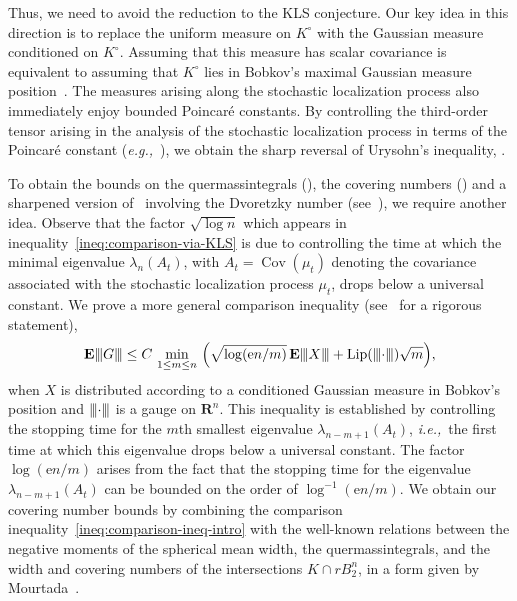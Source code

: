 \documentclass[11pt]{amsart}
\newcommand{\R}{\mathbf R}
\newcommand{\E}{\mathbf E}
\newcommand{\Cov}{\operatorname{Cov}}
\newcommand{\Lip}{\operatorname{Lip}}
\newcommand{\1}{\mathbf 1}
\newcommand{\vertiii}[1]{{\left\vert\kern-0.25ex\left\vert\kern-0.25ex\left\vert #1 
\right\vert\kern-0.25ex\right\vert\kern-0.25ex\right\vert}}
\newcommand{\gauge}[1]{\vertiii{#1}}
\newcommand{\e}{\mathrm{e}}
\newcommand{\ie}{\emph{i.e.,}}
\newcommand{\eg}{\emph{e.g.,}}
\theoremstyle{plain}
\begin{document}
Thus, we need to avoid the reduction to the KLS conjecture. Our key idea in this direction is to replace the uniform measure on $K^\circ$ with the Gaussian measure conditioned on $K^\circ$. Assuming that this measure has scalar covariance is equivalent to assuming that $K^\circ$ lies in Bobkov's maximal Gaussian measure position~\cite{Bob11}. The measures arising along the stochastic localization process also immediately enjoy bounded Poincar\'{e} constants. By controlling the third-order tensor arising in the analysis of the stochastic localization process in terms of the Poincar\'e constant (\eg~), we obtain the sharp reversal of Urysohn's inequality, .

To obtain the bounds on the quermassintegrals (), the covering numbers () and a sharpened version of~ involving the Dvoretzky number (see~), we require another idea. Observe that the factor $\sqrt{\log n}$ which appears in inequality~\eqref{ineq:comparison-via-KLS} is due to controlling the time at which the minimal eigenvalue $\lambda_n(A_t)$, with $A_t = \Cov(\mu_t)$ denoting the covariance associated with the stochastic localization process $\mu_t$, drops below a universal constant. We prove a more general comparison inequality (see~ for a rigorous statement),
\begin{equation}
    \label{ineq:comparison-ineq-intro}
\E \gauge{G} \leq C \,\min_{1 \leq m \leq n } \, \Big(\sqrt{\log(\e n/m)} \, \E \gauge{X} + \Lip(\gauge{\cdot})\sqrt{m} \Big),
\end{equation}
when $X$ is distributed according to a conditioned Gaussian measure in Bobkov's position and $\gauge{\cdot}$ is a gauge on $\R^n$. This inequality is established by controlling the stopping time for the $m$th smallest eigenvalue $\lambda_{n-m+1}(A_t)$, \ie~the first time at which this eigenvalue drops below a universal constant. The factor $\log(\e n/m)$ arises from the fact that the stopping time for the eigenvalue $\lambda_{n-m+1}(A_t)$ can be bounded on the order of $\log^{-1}(\e n/m)$. We obtain our covering number bounds by combining the comparison inequality~\eqref{ineq:comparison-ineq-intro} with the well-known relations between the negative moments of the spherical mean width, the quermassintegrals, and the width and covering numbers of the intersections $K \cap rB^n_2$, in a form given by Mourtada~\cite{Mou25}.
\end{document}
